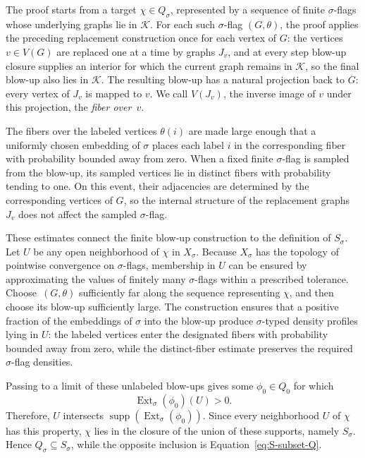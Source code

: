 \documentclass{article}
\newcommand{\Ext}{\operatorname{Ext}}
\begin{document}
The proof starts from a target \(\chi\in Q_\sigma\), represented by a sequence
of finite \(\sigma\)-flags whose underlying graphs lie in \(\mathcal K\).  For
each such \(\sigma\)-flag \((G,\theta)\), the proof applies the preceding
replacement construction once for each vertex of \(G\): the vertices
\(v\in V(G)\) are replaced one at a time by graphs \(J_v\), and at every
step blow-up closure supplies an interior for which the current graph
remains in \(\mathcal K\), so the final blow-up also lies in \(\mathcal K\).  The resulting blow-up has a natural projection back to \(G\): every
vertex of \(J_v\) is mapped to \(v\).  We call \(V(J_v)\), the inverse image of
\(v\) under this projection, the \emph{fiber over~\(v\)}.

The fibers over the labeled vertices \(\theta(i)\) are made large enough that a
uniformly chosen embedding of \(\sigma\) places each label \(i\) in the
corresponding fiber with probability bounded away from zero.  When a fixed
finite \(\sigma\)-flag is sampled from the blow-up, its sampled vertices lie in distinct
fibers with probability tending to one.  On this event, their adjacencies are
determined by the corresponding vertices of \(G\), so the internal structure
of the replacement graphs \(J_v\) does not affect the sampled \(\sigma\)-flag.

These estimates connect the finite blow-up construction to the definition of
\(S_\sigma\).  Let \(U\) be any open neighborhood of \(\chi\) in \(X_\sigma\).
Because \(X_\sigma\) has the topology of pointwise convergence on \(\sigma\)-flags,
membership in \(U\) can be ensured by approximating the values of finitely many
\(\sigma\)-flags within a prescribed tolerance.  Choose~\((G,\theta)\)
sufficiently far along the sequence representing \(\chi\), and then choose its
blow-up sufficiently large.  The construction ensures that a positive fraction
of the embeddings of \(\sigma\) into the blow-up produce \(\sigma\)-typed
density profiles lying in \(U\): the labeled vertices enter the designated
fibers with probability bounded away from zero, while the distinct-fiber
estimate preserves the required \(\sigma\)-flag densities.

Passing to a limit of these unlabeled blow-ups gives some \(\phi_0\in Q_0\) for
which
\[
  \Ext_\sigma(\phi_0)(U)>0.
\]
Therefore, \(U\) intersects \(\operatorname{supp}(\Ext_\sigma(\phi_0))\).  Since
every neighborhood \(U\) of \(\chi\) has this property, \(\chi\) lies in the
closure of the union of these supports, namely \(S_\sigma\).  Hence
\(Q_\sigma\subseteq S_\sigma\), while the opposite inclusion is
Equation~\eqref{eq:S-subset-Q}.
\end{document}

